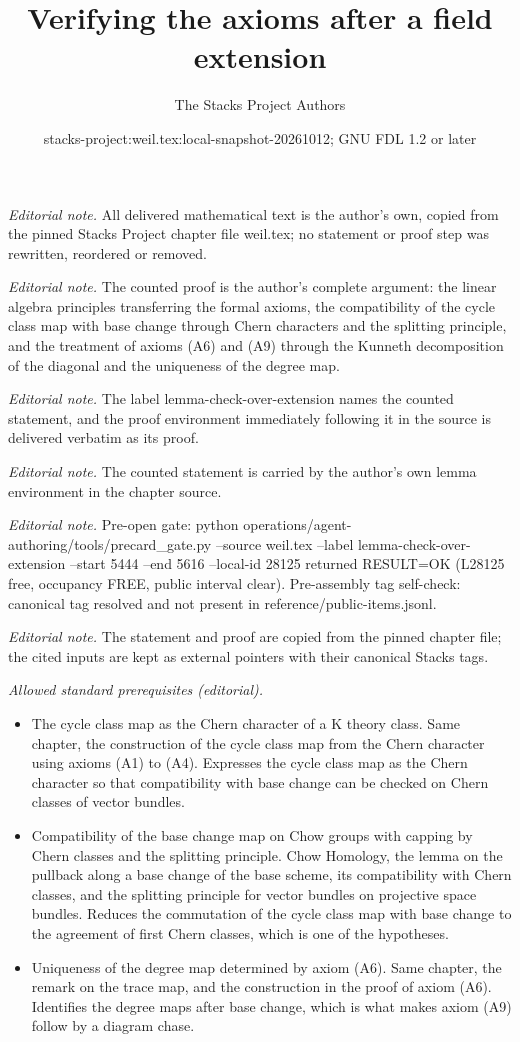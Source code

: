 \documentclass[10pt,a4paper]{amsart}
\title{Verifying the axioms after a field extension}
\author{The Stacks Project Authors}
\date{stacks-project:weil.tex:local-snapshot-20261012; GNU FDL 1.2 or later}
\theoremstyle{plain}
\theoremstyle{definition}
\theoremstyle{remark}
\numberwithin{equation}{subsection}
\begin{document}
\maketitle
\noindent\textit{Editorial note.} All delivered mathematical text is the author's own, copied from the pinned Stacks Project chapter file weil.tex; no statement or proof step was rewritten, reordered or removed.\par\medskip
\noindent\textit{Editorial note.} The counted proof is the author's complete argument: the linear algebra principles transferring the formal axioms, the compatibility of the cycle class map with base change through Chern characters and the splitting principle, and the treatment of axioms (A6) and (A9) through the Kunneth decomposition of the diagonal and the uniqueness of the degree map.\par\medskip
\noindent\textit{Editorial note.} The label lemma-check-over-extension names the counted statement, and the proof environment immediately following it in the source is delivered verbatim as its proof.\par\medskip
\noindent\textit{Editorial note.} The counted statement is carried by the author's own lemma environment in the chapter source.\par\medskip
\noindent\textit{Editorial note.} Pre-open gate: python operations/agent-authoring/tools/precard\_gate.py --source weil.tex --label lemma-check-over-extension --start 5444 --end 5616 --local-id 28125 returned RESULT=OK (L28125 free, occupancy FREE, public interval clear). Pre-assembly tag self-check: canonical tag resolved and not present in reference/public-items.jsonl.\par\medskip
\noindent\textit{Editorial note.} The statement and proof are copied from the pinned chapter file; the cited inputs are kept as external pointers with their canonical Stacks tags.\par\medskip
\noindent\textit{Allowed standard prerequisites (editorial).}\begin{itemize}
\item The cycle class map as the Chern character of a K theory class. Same chapter, the construction of the cycle class map from the Chern character using axioms (A1) to (A4). Expresses the cycle class map as the Chern character so that compatibility with base change can be checked on Chern classes of vector bundles.
\item Compatibility of the base change map on Chow groups with capping by Chern classes and the splitting principle. Chow Homology, the lemma on the pullback along a base change of the base scheme, its compatibility with Chern classes, and the splitting principle for vector bundles on projective space bundles. Reduces the commutation of the cycle class map with base change to the agreement of first Chern classes, which is one of the hypotheses.
\item Uniqueness of the degree map determined by axiom (A6). Same chapter, the remark on the trace map, and the construction in the proof of axiom (A6). Identifies the degree maps after base change, which is what makes axiom (A9) follow by a diagram chase.
\end{itemize}\medskip
\end{document}
